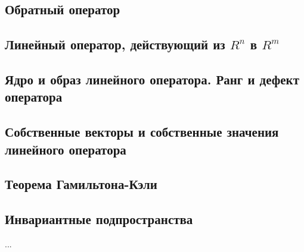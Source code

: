 \subsection{Обратный оператор}
\subsection{Линейный оператор, действующий из $R^n$ в $R^m$}
\subsection{Ядро и образ линейного оператора. Ранг и дефект оператора}
\subsection{Собственные векторы и собственные значения линейного оператора}
\subsection{Теорема Гамильтона-Кэли}

\subsection{Инвариантные подпространства}
...

